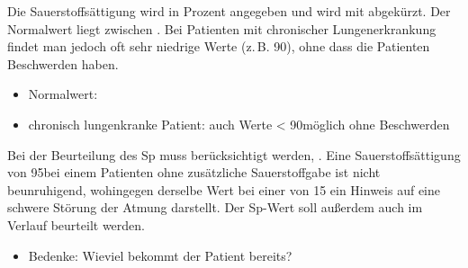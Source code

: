 \begin{Synopsis}
\end{Synopsis}

{%
Die Sauerstoffsättigung wird in Prozent angegeben und wird
mit  abgekürzt. Der Normalwert liegt zwischen
. Bei Patienten mit chronischer Lungenerkrankung findet man
jedoch oft sehr niedrige Werte (z.\,B.
90\PC*), ohne dass die Patienten Beschwerden haben.
}{
\begin{itemize}
  \item Normalwert: \PC*
  \item chronisch lungenkranke Patient: auch Werte < 90\PC* möglich ohne
  Beschwerden
\end{itemize}
}{}{}{}


{%
Bei der Beurteilung des Sp muss berücksichtigt
werden, . Eine Sauerstoffsättigung von 95\PC* bei
einem Patienten ohne zusätzliche Sauerstoffgabe ist nicht
beunruhigend, wohingegen derselbe Wert bei einer
 von 15{\LPerMin*} ein Hinweis auf eine
schwere Störung der Atmung darstellt.
Der Sp-Wert soll außerdem auch im
Verlauf beurteilt werden.
\cite{Soehnke200607}
}{
\begin{itemize}
  \item Bedenke: Wieviel  bekommt der Patient
  bereits?
\end{itemize}
}{}{}{}

\begin{Synopsis}
\end{Synopsis}


